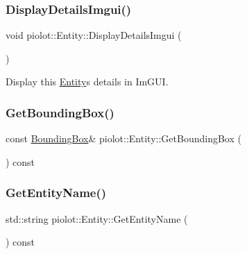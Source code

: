 \subsubsection{\texorpdfstring{Display\+Details\+Imgui()}{DisplayDetailsImgui()}}
{\footnotesize\ttfamily void piolot\+::\+Entity\+::\+Display\+Details\+Imgui (\begin{DoxyParamCaption}{ }\end{DoxyParamCaption})}



Display this \mbox{\hyperlink{classpiolot_1_1_entity}{Entity}}\textquotesingle{}s details in Im\+G\+UI. 

\mbox{\label{classpiolot_1_1_entity_a71f340517f503b0187e96e3f0097fdbc}} 
\subsubsection{\texorpdfstring{Get\+Bounding\+Box()}{GetBoundingBox()}}
{\footnotesize\ttfamily const \mbox{\hyperlink{classpiolot_1_1_bounding_box}{Bounding\+Box}}\& piolot\+::\+Entity\+::\+Get\+Bounding\+Box (\begin{DoxyParamCaption}{ }\end{DoxyParamCaption}) const\hspace{0.3cm}{\ttfamily [inline]}}

\mbox{\label{classpiolot_1_1_entity_afcf183909460f962951d9775126e35dc}} 
\subsubsection{\texorpdfstring{Get\+Entity\+Name()}{GetEntityName()}}
{\footnotesize\ttfamily std\+::string piolot\+::\+Entity\+::\+Get\+Entity\+Name (\begin{DoxyParamCaption}{ }\end{DoxyParamCaption}) const\hspace{0.3cm}{\ttfamily [inline]}}

\mbox{\label{classpiolot_1_1_entity_a6b0a54f38fa54989ad1c237d40fabcb0}} 
